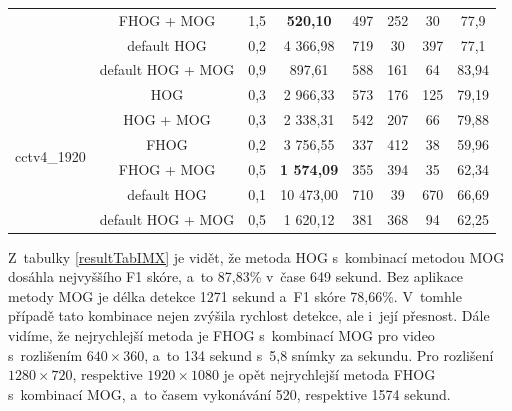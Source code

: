 \begin{table}[H]
\begin{tabular}{|c|c|c|c|c|c|c|c|}
      & FHOG + MOG                 &    1,5 & \textbf{520,10}   & 497 &    252 &     30 &      77,9  \\ \cline{2-8} 
      &  default HOG               &    0,2 & 4 366,98   & 719 &    30 &      397 &     77,1  \\ \cline{2-8}  
      &  default HOG + MOG         &    0,9 & 897,61  & 588 &    161 &     64 &      83,94      \\ \hline \hline  
\multirow{6}{*}{cctv4\_1920}& HOG  &    0,3 & 2 966,33  & 573 &   176 &     125 &      79,19      \\ \cline{2-8}  
      & HOG + MOG                  &    0,3 & 2 338,31  & 542 &    207 &     66 &      79,88      \\ \cline{2-8}  
      & FHOG                       &    0,2 & 3 756,55  & 337 &    412 &     38 &      59,96      \\ \cline{2-8}  
      & FHOG + MOG                 &    0,5 & \textbf{1 574,09}  & 355 &    394 &     35 &      62,34      \\ \cline{2-8}
      &  default HOG               &    0,1 & 10 473,00 & 710 &    39 &      670 &     66,69      \\ \cline{2-8}  
      &  default HOG + MOG         &    0,5 & 1 620,12  & 381 &    368 &     94 &      62,25      \\ \hline
\end{tabular}
\end{table}
Z~tabulky \ref{resultTabIMX} je vidět, že metoda HOG s~kombinací metodou MOG dosáhla nejvyššího F1 skóre, a~to 87,83\% v~čase 649 sekund. Bez aplikace metody MOG je délka detekce 1271 sekund a~F1 skóre 78,66\%. V~tomhle případě tato kombinace nejen zvýšila rychlost detekce, ale i~její přesnost. Dále vidíme, že nejrychlejší metoda je FHOG s~kombinací MOG pro video s~rozlišením $640\times 360$, a~to 134 sekund s~5,8 snímky za sekundu. Pro rozlišení $1280\times720$, respektive $1920\times1080$ je opět nejrychlejší metoda FHOG s~kombinací MOG, a~to časem vykonávání 520, respektive 1574 sekund.

